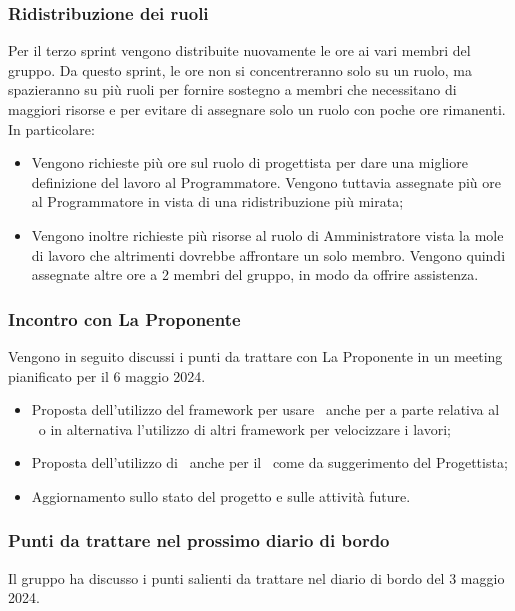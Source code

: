 \subsubsection{Ridistribuzione dei ruoli}
\par Per il terzo sprint vengono distribuite nuovamente le ore ai vari membri del gruppo. Da questo sprint, le ore non si concentreranno solo su un ruolo, ma spazieranno su più ruoli per fornire sostegno a membri che necessitano di maggiori risorse e per evitare di assegnare solo un ruolo con poche ore rimanenti. In particolare:
\begin{itemize}
	\item Vengono richieste più ore sul ruolo di progettista per dare una migliore definizione del lavoro al Programmatore. Vengono tuttavia assegnate più ore al Programmatore in vista di una ridistribuzione più mirata;
	\item Vengono inoltre richieste più risorse al ruolo di Amministratore vista la mole di lavoro che altrimenti dovrebbe affrontare un solo membro. Vengono quindi assegnate altre ore a 2 membri del gruppo, in modo da offrire assistenza. 
\end{itemize}

\subsubsection{Incontro con La Proponente}
\par Vengono in seguito discussi i punti da trattare con La Proponente in un meeting pianificato per il 6 maggio 2024.
\begin{itemize}
	\item Proposta dell'utilizzo del framework  per usare \ anche per a parte relativa al \ o in alternativa l'utilizzo di altri framework per velocizzare i lavori;
	\item Proposta dell'utilizzo di \ anche per il \ come da suggerimento del Progettista;
	\item Aggiornamento sullo stato del progetto e sulle attività future.
\end{itemize}

\subsubsection{Punti da trattare nel prossimo diario di bordo}
\par Il gruppo ha discusso i punti salienti da trattare nel diario di bordo del 3 maggio 2024.
